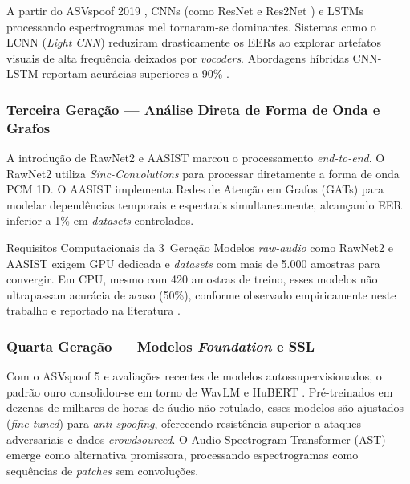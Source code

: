 \documentclass[12pt,a4paper]{article}
\begin{document}
A partir do ASVspoof 2019 \cite{todisco2019asvspoof}, CNNs (como ResNet e
Res2Net \cite{gao2021res2net}) e LSTMs processando espectrogramas mel tornaram-se
dominantes.
Sistemas como o LCNN (\textit{Light CNN}) reduziram drasticamente os EERs ao
explorar artefatos visuais de alta frequ\^{e}ncia deixados por
\textit{vocoders}. Abordagens h\'{i}bridas CNN-LSTM reportam acur\'{a}cias
superiores a 90\% \cite{kurnaz2024hybrid}.

\subsubsection{Terceira Gera\c{c}\~{a}o --- An\'{a}lise Direta de Forma de
Onda e Grafos}

A introdu\c{c}\~{a}o de RawNet2 \cite{tak2021rawnet2} e AASIST
\cite{jung2022aasist} marcou o processamento \textit{end-to-end}.
O RawNet2 utiliza \textit{Sinc-Convolutions} para processar diretamente a
forma de onda PCM 1D.
O AASIST implementa Redes de Aten\c{c}\~{a}o em Grafos (GATs) para modelar
depend\^{e}ncias temporais e espectrais simultaneamente, alcan\c{c}ando EER
inferior a 1\% em \textit{datasets} controlados.

\begin{warningbox}{Requisitos Computacionais da 3\textordfeminine\ Gera\c{c}\~{a}o}
Modelos \textit{raw-audio} como RawNet2 e AASIST exigem GPU dedicada e
\textit{datasets} com mais de 5.000 amostras para convergir. Em CPU, mesmo
com 420 amostras de treino, esses modelos n\~{a}o ultrapassam acur\'{a}cia de
acaso (50\%), conforme observado empiricamente neste trabalho e reportado na
literatura \cite{tak2021rawnet2, jung2022aasist}.
\end{warningbox}

\subsubsection{Quarta Gera\c{c}\~{a}o --- Modelos \textit{Foundation} e SSL}

Com o ASVspoof 5 \cite{wang2024asvspoof5} e avalia\c{c}\~{o}es recentes de
modelos autossupervisionados, o padr\~{a}o ouro consolidou-se em torno de
WavLM \cite{chen2022wavlm} e HuBERT \cite{hsu2021hubert}.
Pr\'{e}-treinados em dezenas de milhares de horas de \'{a}udio n\~{a}o
rotulado, esses modelos s\~{a}o ajustados (\textit{fine-tuned}) para
\textit{anti-spoofing}, oferecendo resist\^{e}ncia superior a ataques
adversariais e dados \textit{crowdsourced}.
O Audio Spectrogram Transformer (AST) \cite{gong2021ast} emerge como
alternativa promissora, processando espectrogramas como sequ\^{e}ncias de
\textit{patches} sem convolu\c{c}\~{o}es.
\end{document}

